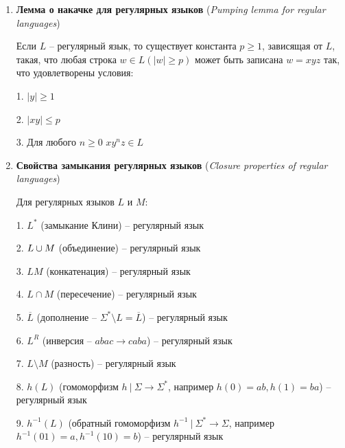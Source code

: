 \documentclass[12pt]{article}
\begin{document}
\begin{enumerate}
        Далее для каждого $k$ от $0$ до $n$ итеративно определяем

        $R^k_{ij} = R^{k - 1}_{ik} (R^{k - 1}_{kk})* R^{k-1}_{kj} | R^{k-1}_{ij}$

        Таким образом, ответом будет регулярное выражение $\bigunion_{i \in \Natural_F} R^n_{0i}$

        \item \textbf{Лемма о накачке для регулярных языков} (\textit{Pumping lemma for regular languages})

        Если $L$ -- регулярный язык, то существует константа $p \geq 1$, зависящая от $L$, такая, что любая строка $w \in L (|w| \geq p)$
        может быть записана $w = xyz$ так, что удовлетворены условия:

        1. $|y| \geq 1$

        2. $|xy| \leq p$

        3. Для любого $n \geq 0$ $xy^n z \in L$

        \item \textbf{Свойства замыкания регулярных языков} (\textit{Closure properties of regular languages})

        Для регулярных языков $L$ и $M$:

        1. $L^*$ (замыкание Клини) -- регулярный язык

        2. $L \cup M$ (объединение) -- регулярный язык

        3. $LM$ (конкатенация) -- регулярный язык

        4. $L \cap M$ (пересечение) -- регулярный язык

        5. $\overline{L}$ (дополнение -- $\Sigma^* \setminus L = \overline{L}$) -- регулярный язык

        6. $L^R$ (инверсия -- $abac \to caba$) -- регулярный язык

        7. $L \setminus M$ (разность) -- регулярный язык

        8. $h(L)$ (гомоморфизм $h \ | \ \Sigma \to \Sigma^*$, например $h(0) = ab, h(1) = ba$) -- регулярный язык

        9. $h^{-1}(L)$ (обратный гомоморфизм $h^{-1} \ | \ \Sigma^* \to \Sigma$, например $h^{-1}(01) = a, h^{-1}(10) = b$) -- регулярный язык

        \smallvspace


\end{enumerate}
\end{document}
